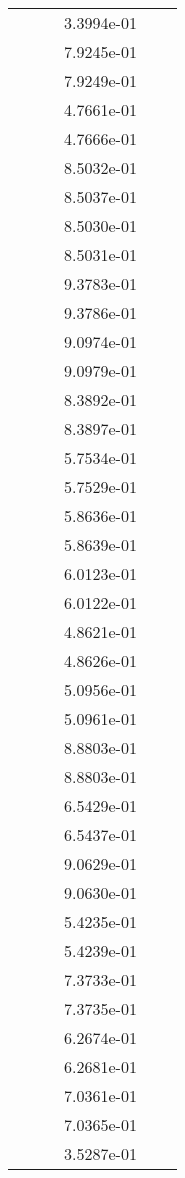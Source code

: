 \begin{xltabular}{\textwidth}{r|rS[table-format=1.3e+2]S[table-format=1.4e+2]S[table-format=1.4e+2]S[table-format=-1.5]}
&  &  & 3.3994e-01 & & \\
&  &  & 7.9245e-01 & & \\
&  &  & 7.9249e-01 & & \\
&  &  & 4.7661e-01 & & \\
&  &  & 4.7666e-01 & & \\
&  &  & 8.5032e-01 & & \\
&  &  & 8.5037e-01 & & \\
&  &  & 8.5030e-01 & & \\
&  &  & 8.5031e-01 & & \\
&  &  & 9.3783e-01 & & \\
&  &  & 9.3786e-01 & & \\
&  &  & 9.0974e-01 & & \\
&  &  & 9.0979e-01 & & \\
&  &  & 8.3892e-01 & & \\
&  &  & 8.3897e-01 & & \\
&  &  & 5.7534e-01 & & \\
&  &  & 5.7529e-01 & & \\
&  &  & 5.8636e-01 & & \\
&  &  & 5.8639e-01 & & \\
&  &  & 6.0123e-01 & & \\
&  &  & 6.0122e-01 & & \\
&  &  & 4.8621e-01 & & \\
&  &  & 4.8626e-01 & & \\
&  &  & 5.0956e-01 & & \\
&  &  & 5.0961e-01 & & \\
&  &  & 8.8803e-01 & & \\
&  &  & 8.8803e-01 & & \\
&  &  & 6.5429e-01 & & \\
&  &  & 6.5437e-01 & & \\
&  &  & 9.0629e-01 & & \\
&  &  & 9.0630e-01 & & \\
&  &  & 5.4235e-01 & & \\
&  &  & 5.4239e-01 & & \\
&  &  & 7.3733e-01 & & \\
&  &  & 7.3735e-01 & & \\
&  &  & 6.2674e-01 & & \\
&  &  & 6.2681e-01 & & \\
&  &  & 7.0361e-01 & & \\
&  &  & 7.0365e-01 & & \\
&  &  & 3.5287e-01 & & \\

\end{xltabular}
